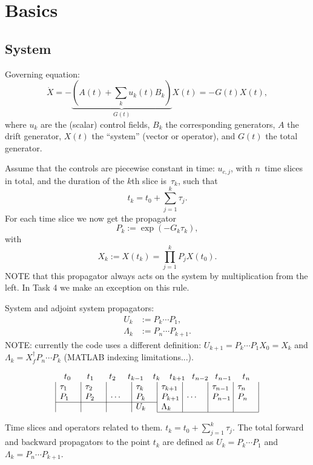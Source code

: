 \documentclass[aps, pra, a4paper]{revtex4}
\newcommand{\be}{\begin{equation}}
\newcommand{\ee}{\end{equation}}
\begin{document}
\section{Basics}

\subsection{System}

Governing equation:
\be
\dot{X} = -\underbrace{(A(t) +\sum_k u_k(t) B_k)}_{G(t)} X(t) = -G(t) X(t),
\ee
where $u_k$ are the (scalar) control fields, $B_k$ the corresponding generators,
$A$ the drift generator, $X(t)$ the ``system'' (vector or operator), and $G(t)$ the total generator.

Assume that the controls are
piecewise constant in time: $u_{c,j}$, with $n$~time slices in total,
and the duration of the $k$th slice is~$\tau_k$, such that
\be
t_k = t_0 + \sum_{j=1}^{k} \tau_j.
\ee
For each time slice we now get the propagator
\be
P_k := \exp(-G_k \tau_k),
\ee
with
\be
X_k := X(t_k) = \prod_{j=1}^{k} P_j X(t_0).
\ee
NOTE that this propagator always acts on the system by multiplication from the left. In Task 4 we make an exception on this rule.


System and adjoint system propagators:
\begin{align}
U_k &:= P_k \cdots P_1,\\      %
\Lambda_k &:= P_n \cdots P_{k+1}.
\end{align}
NOTE: currently the code uses a different definition:
$U_{k+1} = P_k \cdots P_1 X_0 = X_k$ and
$\Lambda_k = X_f^\dagger P_n \cdots P_k$ (MATLAB indexing limitations...).

\begin{table}[h]
\[
\begin{array}{c}
\begin{array}{@{t_0}p{1.9em}@{t_1}p{1.8em}@{t_2}p{1.4em}@{t_{k-1}}p{1.1em}@{t_{k}}p{1.1em}@{t_{k+1}}p{0.8em}@{t_{n-2}}p{0.8em}@{t_{n-1}}p{1.3em}@{t_n}}
& & & & & & &
\end{array}\\
\begin{array}{|p{2em}|p{2em}|p{2em}|p{2em}|p{2em}|p{2em}|p{2em}|p{2em}|}
 $\tau_1$ & $\tau_2$ & & $\tau_k$ & $\tau_{k+1}$ & & $\tau_{n-1}$ & $\tau_n$ \\
 $P_1$ & $P_2$ & $\cdots$ & $P_k$ & $P_{k+1}$ & $\cdots$ & $P_{n-1}$ & $P_n$ \\
\cline{1-4}
& & & $U_{k}$ & $\Lambda_{k}$ & & & \\
\cline{5-8}
\end{array}
\end{array}
\]
\caption{Time slices and operators related to them.
$t_k = t_0 + \sum_{j=1}^{k} \tau_j$.
The total forward and backward
propagators to the point $t_k$ are defined as
$U_k = P_k \cdots P_1$ and
$\Lambda_k = P_{n} \cdots P_{k+1}$.}
\end{table}
\end{document}
